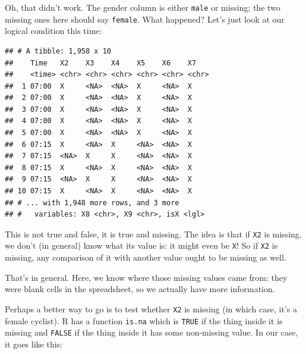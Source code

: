 \documentclass[]{tufte-book}
\newenvironment{Shaded}{}{}
\newcommand{\DataTypeTok}[1]{\textcolor[rgb]{0.56,0.13,0.00}{#1}}
\newcommand{\KeywordTok}[1]{\textcolor[rgb]{0.00,0.44,0.13}{\textbf{#1}}}
\newcommand{\NormalTok}[1]{#1}
\newcommand{\OperatorTok}[1]{\textcolor[rgb]{0.40,0.40,0.40}{#1}}
\newcommand{\StringTok}[1]{\textcolor[rgb]{0.25,0.44,0.63}{#1}}
\theoremstyle{definition}
\theoremstyle{definition}
\theoremstyle{definition}
\theoremstyle{remark}
\begin{document}
Oh, that didn't work. The gender column is either \texttt{male} or
missing; the two missing ones here should say \texttt{female}. What
happened? Let's just look at our logical condition this time:

\begin{Shaded}
\end{Shaded}

\begin{verbatim}
## # A tibble: 1,958 x 10
##    Time   X2    X3    X4    X5    X6    X7   
##    <time> <chr> <chr> <chr> <chr> <chr> <chr>
##  1 07:00  X     <NA>  <NA>  X     <NA>  X    
##  2 07:00  X     <NA>  <NA>  X     <NA>  X    
##  3 07:00  X     <NA>  <NA>  X     <NA>  X    
##  4 07:00  X     <NA>  <NA>  X     <NA>  X    
##  5 07:00  X     <NA>  <NA>  X     <NA>  X    
##  6 07:15  X     <NA>  X     <NA>  <NA>  X    
##  7 07:15  <NA>  X     X     <NA>  <NA>  X    
##  8 07:15  X     <NA>  X     <NA>  <NA>  X    
##  9 07:15  <NA>  X     X     <NA>  <NA>  X    
## 10 07:15  X     <NA>  X     <NA>  <NA>  X    
## # ... with 1,948 more rows, and 3 more
## #   variables: X8 <chr>, X9 <chr>, isX <lgl>
\end{verbatim}

This is not true and false, it is true and missing. The idea is that if
\texttt{X2} is missing, we don't (in general) know what its value is: it
might even be \texttt{X}! So if \texttt{X2} is missing, any comparison
of it with another value ought to be missing as well.

That's in general. Here, we know where those missing values came from:
they were blank cells in the spreadsheet, so we actually have more
information.

Perhaps a better way to go is to test whether \texttt{X2} is missing (in
which case, it's a female cyclist). R has a function \texttt{is.na}
which is \texttt{TRUE} if the thing inside it is missing and
\texttt{FALSE} if the thing inside it has some non-missing value. In our
case, it goes like this:

\begin{Shaded}
\end{Shaded}
\end{document}
